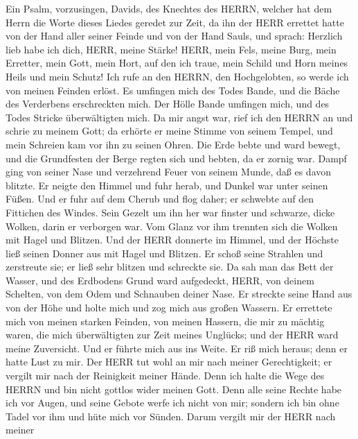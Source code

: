  Ein Psalm, vorzusingen, Davids, des Knechtes des HERRN,
welcher hat dem Herrn die Worte dieses Liedes geredet zur Zeit, da ihn
der HERR errettet hatte von der Hand aller seiner Feinde und von der
Hand Sauls, und sprach: Herzlich lieb habe ich dich, HERR, meine Stärke!
 HERR, mein Fels, meine Burg, mein Erretter, mein Gott, mein
Hort, auf den ich traue, mein Schild und Horn meines Heils und mein
Schutz!  Ich rufe an den HERRN, den Hochgelobten, so werde
ich von meinen Feinden erlöst.  Es umfingen mich des Todes
Bande, und die Bäche des Verderbens erschreckten mich.  Der
Hölle Bande umfingen mich, und des Todes Stricke überwältigten mich.
 Da mir angst war, rief ich den HERRN an und schrie zu
meinem Gott; da erhörte er meine Stimme von seinem Tempel, und mein
Schreien kam vor ihn zu seinen Ohren.  Die Erde bebte und
ward bewegt, und die Grundfesten der Berge regten sich und bebten, da er
zornig war.  Dampf ging von seiner Nase und verzehrend Feuer
von seinem Munde, daß es davon blitzte.  Er neigte den
Himmel und fuhr herab, und Dunkel war unter seinen Füßen. 
Und er fuhr auf dem Cherub und flog daher; er schwebte auf den Fittichen
des Windes.  Sein Gezelt um ihn her war finster und
schwarze, dicke Wolken, darin er verborgen war.  Vom Glanz
vor ihm trennten sich die Wolken mit Hagel und Blitzen. 
Und der HERR donnerte im Himmel, und der Höchste ließ seinen Donner aus
mit Hagel und Blitzen.  Er schoß seine Strahlen und
zerstreute sie; er ließ sehr blitzen und schreckte sie.  Da
sah man das Bett der Wasser, und des Erdbodens Grund ward aufgedeckt,
HERR, von deinem Schelten, von dem Odem und Schnauben deiner Nase.
 Er streckte seine Hand aus von der Höhe und holte mich und
zog mich aus großen Wassern.  Er errettete mich von meinen
starken Feinden, von meinen Hassern, die mir zu mächtig waren,
 die mich überwältigten zur Zeit meines Unglücks; und der
HERR ward meine Zuversicht.  Und er führte mich aus ins
Weite. Er riß mich heraus; denn er hatte Lust zu mir.  Der
HERR tut wohl an mir nach meiner Gerechtigkeit; er vergilt mir nach der
Reinigkeit meiner Hände.  Denn ich halte die Wege des HERRN
und bin nicht gottlos wider meinen Gott.  Denn alle seine
Rechte habe ich vor Augen, und seine Gebote werfe ich nicht von mir;
 sondern ich bin ohne Tadel vor ihm und hüte mich vor
Sünden.  Darum vergilt mir der HERR nach meiner
